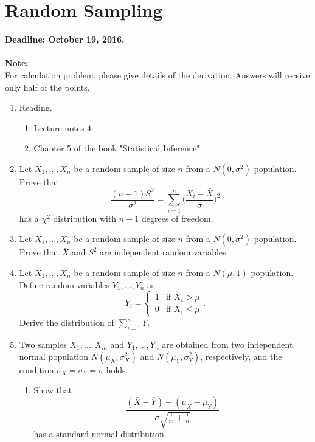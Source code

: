 \documentclass[12pt]{report}
\begin{document}
\chapter{Random Sampling}

\textcolor{MyRed}{
\textbf{
    \Large
    Deadline: October 19, 2016.
}
}\\\\
\textbf{Note:\\}For calculation problem, please give details of the derivation. Answers will receive only half of the points.



\begin{enumerate}

    \item Reading.
    \begin{enumerate}
        \item Lecture notes 4.
        \item Chapter 5 of the book "Statistical Inference".
    \end{enumerate}
     
    \item Let $X_1, \ldots, X_n$ be a random sample of size $n$ from a $N(0, \sigma^2)$ population. Prove that
        \[
            \frac{(n-1)S^2}{\sigma^2} = \sum_{i=1}^n\Big(\frac{X_i-\bar{X}}{\sigma}\Big)^2
        \]
        has a $\chi^2$ distribution with $n-1$ degrees of freedom.

    \item Let $X_1, \ldots, X_n$ be a random sample of size $n$ from a $N(0, \sigma^2)$ population. Prove that $\bar{X}$ and $S^2$ are independent random variables.
    
    \item Let $X_1, \ldots, X_n$ be a random sample of size $n$ from a $N(\mu, 1)$ population. Define random variables $Y_1,\ldots,Y_n$ as
        \[
            Y_i= \left \{
            \begin{array}{ll}
              1 & \mbox{if } X_i > \mu \\
              0 & \mbox{if } X_i \leq    \mu
            \end{array}
            \right.
            .
        \]
        Derive the distribution of $\sum_{i=1}^nY_i$
      \item Two samples $X_1,\ldots,X_m$ and $Y_1,\ldots,Y_n$ are obtained from two independent normal population $N(\mu_X, \sigma_X^2)$ and $N(\mu_Y, \sigma_Y^2)$, respectively, and the condition $   \sigma_X=\sigma_Y=\sigma$ holds.
        \begin{enumerate}
        \item Show that
            \[
                \frac{
                    (\bar{X} - \bar{Y}) - (\mu_X - \mu_Y)
                }{
                    \sigma \sqrt{\frac{1}{m} + \frac{1}{n}}
                }
            \]
            has a standard normal distribution.



\end{enumerate}
\end{enumerate}
\end{document}
